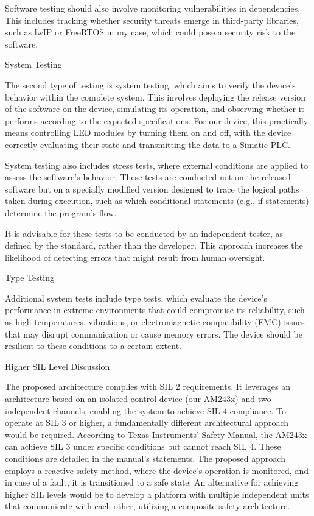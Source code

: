 Software testing should also involve monitoring vulnerabilities in dependencies. This includes tracking whether security threats emerge in third-party libraries, such as lwIP or FreeRTOS in my case, which could pose a security risk to the software.


\secc System Testing

The second type of testing is system testing, which aims to verify the device’s behavior within the complete system. This involves deploying the release version of the software on the device, simulating its operation, and observing whether it performs according to the expected specifications. For our device, this practically means controlling LED modules by turning them on and off, with the device correctly evaluating their state and transmitting the data to a Simatic PLC.

System testing also includes stress tests, where external conditions are applied to assess the software’s behavior. These tests are conducted not on the released software but on a specially modified version designed to trace the logical paths taken during execution, such as which conditional statements (e.g., if statements) determine the program’s flow.

It is advisable for these tests to be conducted by an independent tester, as defined by the standard, rather than the developer. This approach increases the likelihood of detecting errors that might result from human oversight.

\secc Type Testing

Additional system tests include type tests, which evaluate the device’s performance in extreme environments that could compromise its reliability, such as high temperatures, vibrations, or electromagnetic compatibility (EMC) issues that may disrupt communication or cause memory errors. The device should be resilient to these conditions to a certain extent.


\sec Higher SIL Level Discussion

The proposed architecture complies with SIL 2 requirements. It leverages an architecture based on an isolated control device (our AM243x) and two independent channels, enabling the system to achieve SIL 4 compliance. To operate at SIL 3 or higher, a fundamentally different architectural approach would be required. According to Texas Instruments’ Safety Manual, the AM243x can achieve SIL 3 under specific conditions but cannot reach SIL 4. These conditions are detailed in the manual’s statements. The proposed approach employs a reactive safety method, where the device’s operation is monitored, and in case of a fault, it is transitioned to a safe state. An alternative for achieving higher SIL levels would be to develop a platform with multiple independent units that communicate with each other, utilizing a composite safety architecture.

